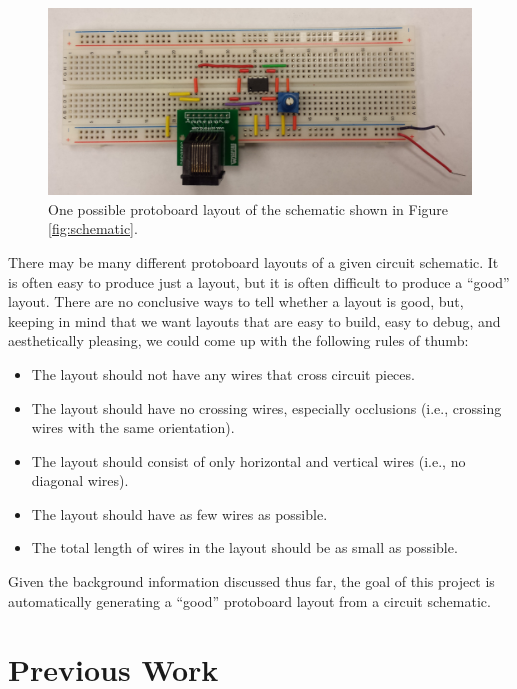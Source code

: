 \begin{figure}
\begin{center}
\includegraphics[width=\textwidth]{Images/sample_physical_layout.jpg}
\caption[Sample protoboard layout]{One possible protoboard layout of the
schematic shown in Figure \ref{fig:schematic}.}
\label{fig:eg_s_to_pb}
\end{center}
\end{figure}

There may be many different protoboard layouts of a given circuit
schematic. It is often easy to produce just a layout, but it is often difficult
to produce a ``good'' layout.
There are no conclusive ways to tell whether a layout is good, but, keeping in
mind that we want layouts that are easy to build,
easy to debug, and aesthetically pleasing, we could come up with the
following rules of thumb:
\begin{itemize}
\item The layout should not have any wires that cross circuit pieces.
\item The layout should have no crossing wires, especially occlusions (i.e.,
crossing wires with the same orientation).
\item The layout should consist of only horizontal and vertical wires (i.e., no
diagonal wires).
\item The layout should have as few wires as possible.
\item The total length of wires in the layout should be as small as possible.
\end{itemize}

Given the background information discussed thus far, the goal of this project is
automatically generating a ``good'' protoboard layout from a circuit schematic.

\section{Previous Work}

